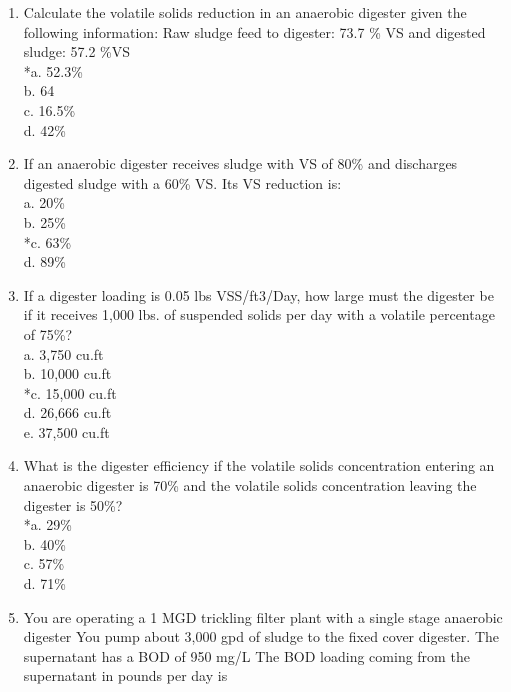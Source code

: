\documentclass{article}
\begin{document}
\begin{enumerate}
\item  Calculate the volatile solids reduction in an anaerobic digester given the following information:  Raw sludge feed to digester:  73.7 \% VS and digested sludge: 57.2 \%VS \\

*a. 52.3\% \\
b. 64 \\
c. 16.5\% \\
d. 42\% \\

\item  If an anaerobic digester receives sludge with VS of 80\% and discharges digested sludge with a 60\% VS.  Its VS reduction is: \\

a. 20\% \\
b. 25\% \\
*c. 63\% \\
d. 89\% \\

\item  If a digester loading is 0.05 lbs VSS/ft3/Day, how large must the digester be if it receives 1,000 lbs. of suspended solids per day with a volatile percentage of 75\%? \\

a. 3,750 cu.ft \\
b. 10,000 cu.ft \\
*c. 15,000 cu.ft \\
d. 26,666 cu.ft \\
e. 37,500 cu.ft \\

\item  What is the digester efficiency if the volatile solids concentration entering an anaerobic digester is 70\% and the volatile solids concentration leaving the digester is 50\%? \\

*a. 29\% \\
b. 40\% \\
c. 57\% \\
d. 71\% \\

\item  You are operating a 1 MGD trickling filter plant with a single stage anaerobic digester You pump about 3,000 gpd of sludge to the fixed cover digester.  The supernatant has a BOD of 950 mg/L The BOD loading coming from the supernatant in pounds per day is \\


\end{enumerate}
\end{document}

